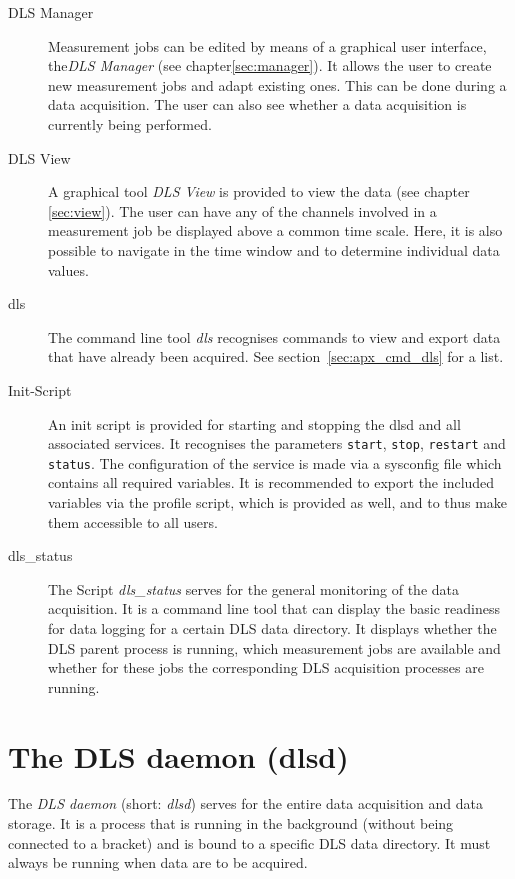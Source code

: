 \documentclass[a4paper,12pt,BCOR6mm,bibtotoc,idxtotoc]{scrbook}
\begin{document}
\begin{description} 
\item[DLS Manager] Measurement jobs can be edited by means of a graphical user interface, the\textit{DLS Manager} (see chapter\ref{sec:manager}). It allows the user to create new measurement jobs and adapt existing ones. This can be done during a data acquisition. The user can also see whether a data acquisition is currently being performed. 
\item[DLS View] A graphical tool \textit{DLS View} is provided to view the data (see chapter \ref{sec:view}). The user can have any of the channels involved in a measurement job be displayed above a common time scale. Here, it is also possible to navigate in the time window and to determine individual data values.
\item[dls] The command line tool \textit{dls} recognises commands to view and export data that have already been acquired. See section~\ref{sec:apx_cmd_dls} for a list. 
\item[Init-Script] An init script is provided for starting and stopping the dlsd and all associated services. It recognises the parameters \texttt{start}, \texttt{stop}, \texttt{restart} and \texttt{status}. The configuration of the service is made via a sysconfig file which contains all required variables. It is recommended to export the included variables via the profile script, which is provided as well, and to thus make them accessible to all users. 
\item[dls\_status] The Script \textit{dls\_\-status} serves for the general monitoring of the data acquisition. It is a command line tool that can display the basic readiness for data logging for a certain DLS data directory. It displays whether the DLS parent process is running, which measurement jobs are available and whether for these jobs the corresponding DLS acquisition processes are running. \end{description}


\chapter{The DLS daemon (dlsd)} \label{sec:dlsd}

The \textit{DLS daemon} (short: \textit{dlsd}) serves for the entire data acquisition and data storage. It is a process that is running in the background (without being connected to a bracket) and is bound to a specific DLS data directory. It must always be running when data are to be acquired.
\end{document}
